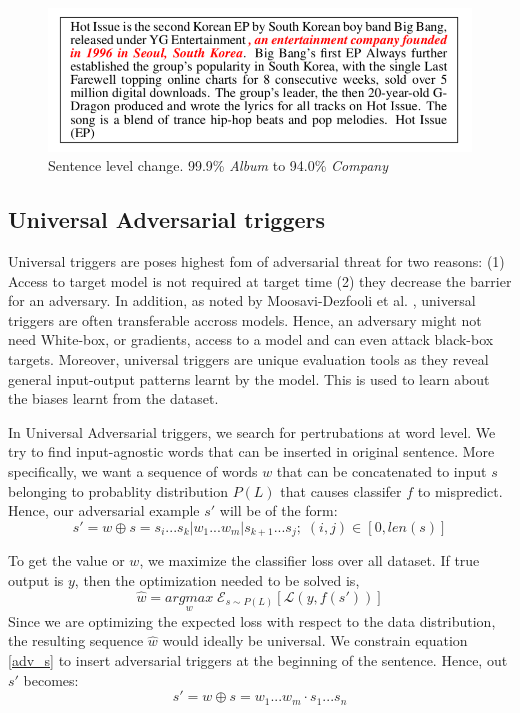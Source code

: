 \documentclass[12pt]{report}
\begin{document}
\begin{spacing}{1.5}
\begin{figure}[!h]
  \centering
  \includegraphics[width=0.8\linewidth]{./img/liang_sen.png}
  \caption{Sentence level change. 99.9\% \textit{Album} to 94.0\% \textit{Company} \cite{liang2018}}
  \label{liang_sen}
\end{figure}

\subsection{Universal Adversarial triggers}
\label{adv_theory}
Universal triggers are poses highest fom of adversarial threat for two reasons: (1) Access to target model is not required at target time (2) they decrease the barrier for an adversary. In addition, as noted by Moosavi-Dezfooli et al. \cite{moosavi-dezfooli}, universal triggers are often transferable accross models. Hence, an adversary might not need White-box, or gradients, access to a model and can even attack black-box targets.
Moreover, universal triggers are unique evaluation tools as they reveal general input-output patterns learnt by the model. This is used to learn about the biases learnt from the dataset.
\par
In Universal Adversarial triggers, we search for pertrubations at word level.
We try to find input-agnostic words that can be inserted in original sentence.
More specifically, we want a sequence of words $w$ that can be concatenated to input $s$ belonging to probablity distribution $P(L)$ that causes classifer $f$ to mispredict.
Hence, our adversarial example $s'$ will be of the form:
\begin{equation}
  \label{adv_s}
  s' = w \oplus s = s_i...s_k | w_1...w_m | s_{k+1}...s_j; \; (i,j) \in [0, len(s)] 
\end{equation}

To get the value or $w$, we maximize the classifier loss over all dataset. If true output is $y$, then the optimization needed to be solved is,
\begin{equation}
  \label{eq: optim}
  \hat{w} = \underset{w}{argmax} \; \mathcal{E}_{s \sim P(L)}[\mathcal{L}(y, f(s'))]
\end{equation}
Since we are optimizing the expected loss with respect to the
data distribution, the resulting sequence $\hat{w}$ would ideally be
universal. We constrain equation \ref{adv_s} to insert adversarial triggers at the beginning of the sentence. Hence, out $s'$ becomes:
\begin{equation}
  \label{eq: trigger}
  s' = w \oplus s = w_1...w_m \cdot s_1...s_n
\end{equation}


\end{spacing}
\end{document}
